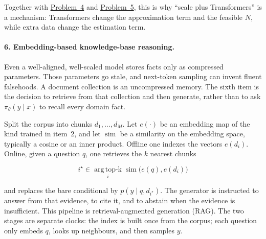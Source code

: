 \documentclass[11pt,a4paper]{article}
\newcommand{\jump}[2]{\hyperref[#1]{#2}}
\theoremstyle{definition}
\begin{document}
Together with \jump{prob:spr2025-nlp-4}{Problem~4} and \jump{prob:spr2025-nlp-5}{Problem~5}, this is why ``scale plus Transformers'' is a mechanism: Transformers change the approximation term and the feasible \(N\), while extra data change the estimation term.

\paragraph{6. Embedding-based knowledge-base reasoning.}
Even a well-aligned, well-scaled model stores facts only as compressed parameters. Those parameters go stale, and next-token sampling can invent fluent falsehoods. A document collection is an uncompressed memory. The sixth item is the decision to retrieve from that collection and then generate, rather than to ask \(\pi_\theta(y\mid x)\) to recall every domain fact.

Split the corpus into chunks \(d_1,\ldots,d_M\). Let \(e(\cdot)\) be an embedding map of the kind trained in item~2, and let \(\operatorname{sim}\) be a similarity on the embedding space, typically a cosine or an inner product. Offline one indexes the vectors \(e(d_i)\). Online, given a question \(q\), one retrieves the \(k\) nearest chunks

\[
i^\star\in\operatorname*{arg\,top\text{-}k}_{i}\operatorname{sim}\bigl(e(q),e(d_i)\bigr)
\]

and replaces the bare conditional by \(p(y\mid q,d_{i^\star})\). The generator is instructed to answer from that evidence, to cite it, and to abstain when the evidence is insufficient. This pipeline is retrieval-augmented generation (RAG). The two stages are separate clocks: the index is built once from the corpus; each question only embeds \(q\), looks up neighbours, and then samples \(y\).
\end{document}
